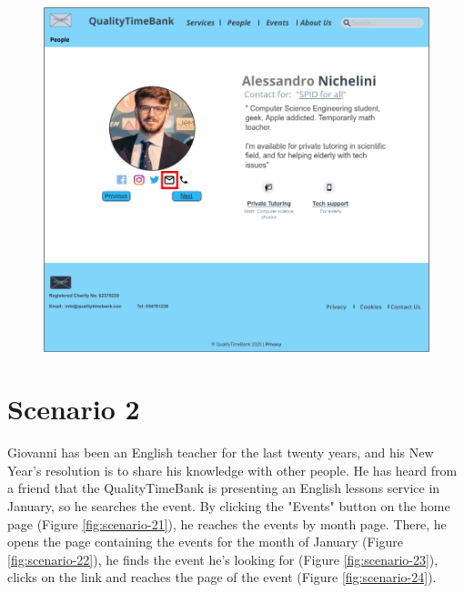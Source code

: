 \documentclass[a4paper, 11pt, parskip=half, headsepline]{scrreprt}
\begin{document}
\begin{figure}[H]
	\centering
	\includegraphics[width=1\linewidth, keepaspectratio]{scenarios/scenario-14}
	\caption{}
	\label{fig:scenario-14}
\end{figure}

\section{Scenario 2}	

Giovanni has been an English teacher for the last twenty years, and his New Year's resolution is to share his knowledge with other people. He has heard from a friend that the QualityTimeBank is presenting an English lessons service in January, so he searches the event. By clicking the "Events" button on the home page (Figure \ref{fig:scenario-21}), he reaches the events by month page. There, he opens the page containing the events for the month of January (Figure \ref{fig:scenario-22}), he finds the event he's looking for (Figure \ref{fig:scenario-23}), clicks on the link and reaches the page of the event (Figure \ref{fig:scenario-24}).
\end{document}
